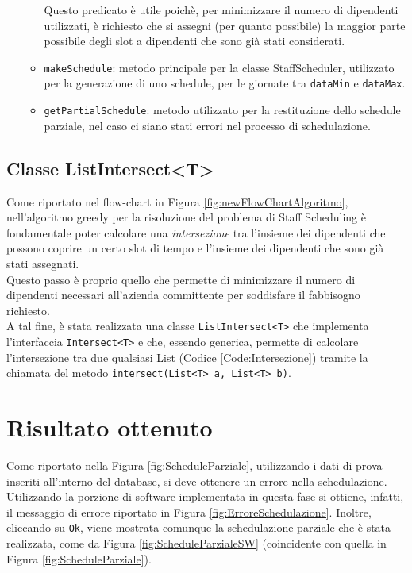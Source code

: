 \begin{itemize}
\begin{itemize}
				Questo predicato è utile poichè, per minimizzare il numero di dipendenti utilizzati, è richiesto che si assegni (per quanto possibile) la maggior parte possibile degli slot a dipendenti che sono già stati considerati.
			\item \verb|makeSchedule|: metodo principale per la classe StaffScheduler, utilizzato per la generazione di uno schedule, per le giornate tra \verb|dataMin| e \verb|dataMax|.
			\item \verb|getPartialSchedule|: metodo utilizzato per la restituzione dello schedule parziale, nel caso ci siano stati errori nel processo di schedulazione.
		\end{itemize}
\end{itemize}
\subsection{Classe ListIntersect<T>}
Come riportato nel flow-chart in Figura \ref{fig:newFlowChartAlgoritmo}, nell'algoritmo greedy per la risoluzione del problema di Staff Scheduling è fondamentale poter calcolare una \textit{intersezione} tra l'insieme dei dipendenti che possono coprire un certo slot di tempo e l'insieme dei dipendenti che sono già stati assegnati.\\
Questo passo è proprio quello che permette di minimizzare il numero di dipendenti necessari all'azienda committente per soddisfare il fabbisogno richiesto.\\

\noindent
A tal fine, è stata realizzata una classe \verb|ListIntersect<T>| che implementa l'interfaccia \verb|Intersect<T>| e che, essendo generica, permette di calcolare l'intersezione tra due qualsiasi List (Codice \ref{Code:Intersezione}) tramite la chiamata del metodo \verb|intersect(List<T> a, List<T> b)|.
\lstset{
    caption=Classe ListIntersect,
    label=Code:Intersezione }

\section{Risultato ottenuto}
Come riportato nella Figura \ref{fig:ScheduleParziale}, utilizzando i dati di prova inseriti all'interno del database, si deve ottenere un errore nella schedulazione.\\
Utilizzando la porzione di software implementata in questa fase si ottiene, infatti, il messaggio di errore riportato in Figura \ref{fig:ErroreSchedulazione}.
\noindent
Inoltre, cliccando su \verb|Ok|, viene mostrata comunque la schedulazione parziale che è stata realizzata, come da Figura \ref{fig:ScheduleParzialeSW} (coincidente con quella in Figura \ref{fig:ScheduleParziale}).

